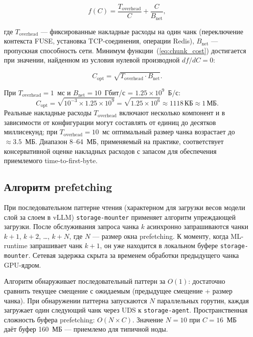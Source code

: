 \begin{equation}
f(C) = \frac{T_{\mathrm{overhead}}}{C} + \frac{C}{B_{\mathrm{net}}},
\label{eq:chunk_cost}
\end{equation}

где $T_{\mathrm{overhead}}$ --- фиксированные накладные расходы на один чанк (переключение контекста FUSE, установка TCP-соединения, операции Redis), $B_{\mathrm{net}}$ --- пропускная способность сети. Минимум функции~(\ref{eq:chunk_cost}) достигается при значении, найденном из условия нулевой производной $df/dC = 0$:

\begin{equation}
C_{\mathrm{opt}} = \sqrt{T_{\mathrm{overhead}} \cdot B_{\mathrm{net}}}.
\label{eq:chunk_opt}
\end{equation}

При $T_{\mathrm{overhead}} = 1$~мс и $B_{\mathrm{net}} = 10$~Гбит/с = $1.25 \times 10^9$~Б/с:
\[
C_{\mathrm{opt}} = \sqrt{10^{-3} \times 1.25 \times 10^9} = \sqrt{1.25 \times 10^6} \approx 1118\,\text{КБ} \approx 1\,\text{МБ}.
\]
Реальные накладные расходы $T_{\mathrm{overhead}}$ включают несколько компонент и в зависимости от конфигурации могут составлять от единиц до десятков миллисекунд; при $T_{\mathrm{overhead}} = 10$~мс оптимальный размер чанка возрастает до $\approx 3.5$~МБ. Диапазон 8--64~МБ, применяемый на практике, соответствует консервативной оценке накладных расходов с запасом для обеспечения приемлемого time-to-first-byte.

\subsection*{Алгоритм prefetching}

При последовательном паттерне чтения (характерном для загрузки весов модели слой за слоем в vLLM) \texttt{storage-mounter} применяет алгоритм упреждающей загрузки. После обслуживания запроса чанка $k$ асинхронно запрашиваются чанки $k{+}1$, $k{+}2$, \ldots, $k{+}N$, где $N$ --- размер окна prefetching. К моменту, когда ML-runtime запрашивает чанк $k{+}1$, он уже находится в локальном буфере \texttt{storage-mounter}. Сетевая задержка скрыта за временем обработки предыдущего чанка GPU-ядром.

Алгоритм обнаруживает последовательный паттерн за $O(1)$: достаточно сравнить текущее смещение с ожидаемым (предыдущее смещение + размер чанка). При обнаружении паттерна запускаются $N$ параллельных горутин, каждая загружает один следующий чанк через UDS к \texttt{storage-agent}. Пространственная сложность буфера prefetching: $O(N \times C)$. Значение $N = 10$ при $C = 16$~МБ даёт буфер 160~МБ --- приемлемо для типичной ноды.

